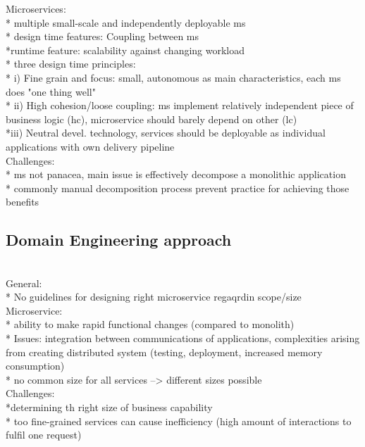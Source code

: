 Microservices: \\
* multiple small-scale and independently deployable ms\\
* design time features: Coupling between ms \\
*runtime feature: scalability against changing workload\\
* three design time principles:\\
* i) Fine grain and focus: small, autonomous as main characteristics, each ms does "one thing well"\\
* ii) High cohesion/loose coupling: ms implement relatively independent piece of business logic (hc), microservice should barely depend on other (lc) \\
*iii) Neutral devel. technology, services should be deployable as individual applications with own delivery pipeline \\


Challenges:\\
* ms not panacea, main issue is effectively decompose a monolithic application \\
* commonly manual decomposition process prevent practice for achieving those benefits \\



\subsection{Domain Engineering approach}
\cite{DomainEngineeringMunezero} \\

General:\\
* No guidelines for designing right microservice regaqrdin scope/size \\

Microservice:\\
* ability to make rapid functional changes (compared to monolith)\\
* Issues: integration between communications of applications, complexities arising from creating distributed system (testing, deployment, increased memory consumption)\\
* no common size for all services --> different sizes possible\\


Challenges: \\
*determining th right size of business capability \\
* too fine-grained services can cause inefficiency (high amount of interactions to fulfil one request)\\

